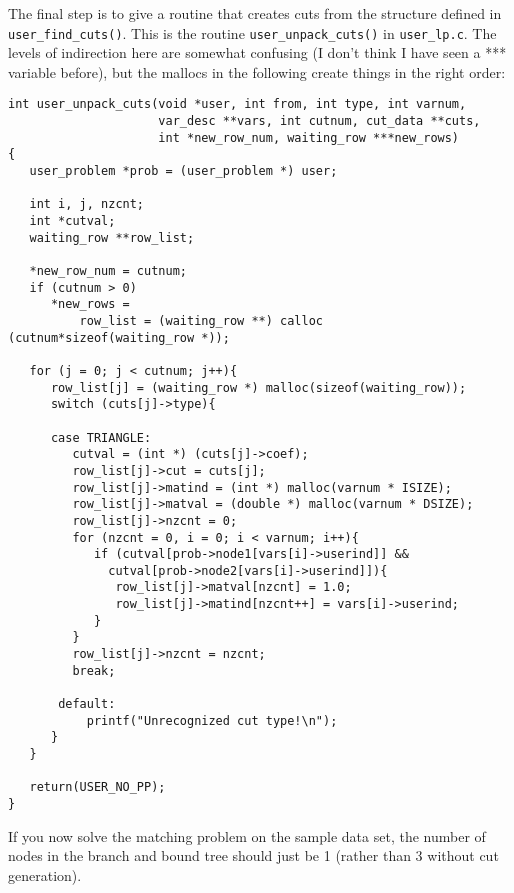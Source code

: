 \documentclass[11pt]{article}
\begin{document}
The final step is to give a routine that creates cuts from the structure
defined in \texttt{user\_find\_cuts()}. This is the routine
\texttt{user\_unpack\_cuts()} in \texttt{user\_lp.c}. The levels of
indirection here are somewhat confusing (I don't think I have seen a ***
variable before), but the mallocs in the following create things in the right
order:
\begin{verbatim}
int user_unpack_cuts(void *user, int from, int type, int varnum,
                     var_desc **vars, int cutnum, cut_data **cuts,
                     int *new_row_num, waiting_row ***new_rows)
{
   user_problem *prob = (user_problem *) user;
   
   int i, j, nzcnt;
   int *cutval;
   waiting_row **row_list;
   
   *new_row_num = cutnum;
   if (cutnum > 0)
      *new_rows =
          row_list = (waiting_row **) calloc (cutnum*sizeof(waiting_row *));
   
   for (j = 0; j < cutnum; j++){
      row_list[j] = (waiting_row *) malloc(sizeof(waiting_row));
      switch (cuts[j]->type){
	 
      case TRIANGLE:
         cutval = (int *) (cuts[j]->coef);
         row_list[j]->cut = cuts[j];
         row_list[j]->matind = (int *) malloc(varnum * ISIZE);
         row_list[j]->matval = (double *) malloc(varnum * DSIZE);
         row_list[j]->nzcnt = 0;
         for (nzcnt = 0, i = 0; i < varnum; i++){
            if (cutval[prob->node1[vars[i]->userind]] &&
              cutval[prob->node2[vars[i]->userind]]){
               row_list[j]->matval[nzcnt] = 1.0;
               row_list[j]->matind[nzcnt++] = vars[i]->userind;
            }
         }
         row_list[j]->nzcnt = nzcnt;
         break;

       default:
           printf("Unrecognized cut type!\n");
      }
   }
   
   return(USER_NO_PP);
}
\end{verbatim}

If you now solve the matching problem on the sample data set, the number of
nodes in the branch and bound tree should just be 1 (rather than 3 without cut
generation).
\end{document}
